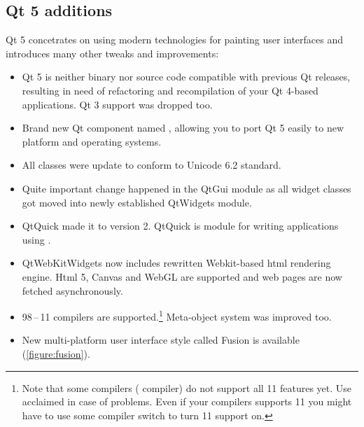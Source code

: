 \subsection{Qt 5 additions}
Qt 5 concetrates on using modern technologies for painting user interfaces and introduces many other tweaks and improvements:
\begin{itemize}
\item
Qt 5 is neither binary nor source code compatible with previous Qt releases, resulting in need of refactoring and recompilation of your Qt 4-based applications. Qt 3 support was dropped too.


\item
Brand new Qt component named , allowing you to port Qt 5 easily to new platform and operating systems.

\item
All classes were update to conform to Unicode 6.2 standard.

\item
Quite important change happened in the QtGui module as all widget classes got moved into newly established QtWidgets module.

\item
QtQuick made it to version 2. QtQuick is module for writing applications using .

\item
QtWebKitWidgets now includes rewritten Webkit-based html rendering engine. Html 5, Canvas and WebGL are supported and web pages are now fetched asynchronously.


\item
\cpp{} 98\,--\,11 compilers are supported.\footnote{Note that some compilers (\eg {} compiler) do not support all \cpp{} 11 features yet. Use acclaimed  in case of problems. Even if your compilers supports \cpp{} 11 you might have to use some compiler switch to turn \cpp{} 11 support on.} Meta-object system was improved too.

\item
New multi-platform user interface style called Fusion is available (\autoref{figure:fusion}).
\end{itemize}

